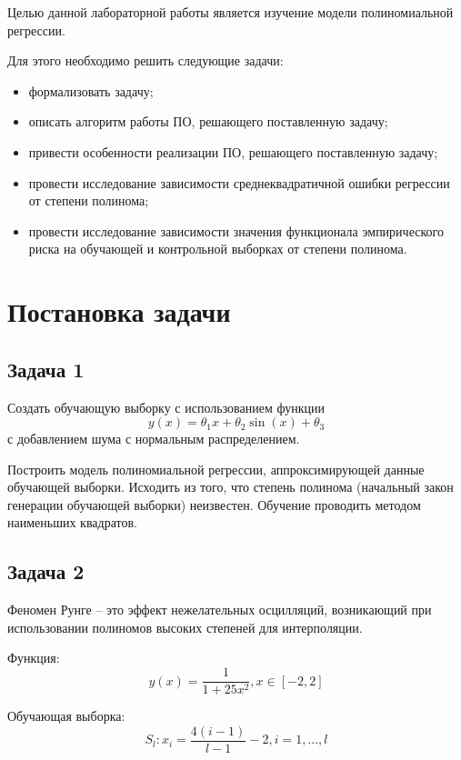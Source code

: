 \documentclass[12pt]{report}
\begin{document}
Целью данной лабораторной работы является изучение модели полиномиальной регрессии.

Для этого необходимо решить следующие задачи:
\begin{itemize}
    \item формализовать задачу;
    \item описать алгоритм работы ПО, решающего поставленную задачу;
    \item привести особенности реализации ПО, решающего поставленную задачу;
    \item провести исследование зависимости среднеквадратичной ошибки регрессии от степени полинома;
    \item провести исследование зависимости значения функционала эмпирического риска на обучающей и контрольной выборках от степени полинома.
\end{itemize}

\section{Постановка задачи}
\subsection{Задача 1}
Создать обучающую выборку с использованием функции
\begin{equation}
    y(x) = \theta_1 x + \theta_2\sin(x) + \theta_3
\end{equation} 
с добавлением шума с нормальным распределением.

Построить модель полиномиальной регрессии, аппроксимирующей данные обучающей выборки. Исходить из того, что степень полинома (начальный закон генерации обучающей выборки) неизвестен. 
Обучение проводить методом наименьших квадратов.

\subsection{Задача 2}
Феномен Рунге -- это эффект нежелательных осцилляций, возникающий при использовании полиномов высоких степеней для интерполяции. 

Функция:
\begin{equation}
    y(x) = \frac{1}{1 + 25x^2}, x \in [-2,2]
\end{equation}

Обучающая выборка:
\begin{equation}
S_l: x_i = \frac{4(i-1)}{l-1} - 2, i=1,\ldots,l 
\end{equation}
\end{document}
